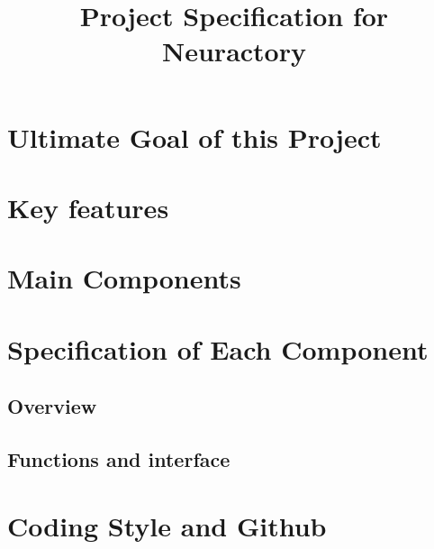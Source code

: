 \documentclass[a4paper,24pt,openany]{article}
\title{\Huge Project Specification for Neuractory}
\begin{document}
\maketitle
\newpage

\large\tableofcontents
\newpage

\section{Ultimate Goal of this Project}
\large
\section{Key features}
\section{Main Components}
\section{Specification of Each Component}
\subsection{Overview}
\subsection{Functions and interface} %
\section{Coding Style and Github} %
\end{document}
